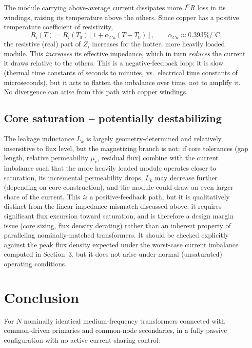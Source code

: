\documentclass[11pt,a4paper]{article}
\begin{document}
The module carrying above-average current dissipates more $I^2R$ loss in its windings, raising its temperature above the others. Since copper has a positive temperature coefficient of resistivity,
\begin{equation}
R_i(T) = R_i(T_0)\left[1+\alpha_{Cu}(T-T_0)\right], \qquad \alpha_{Cu}\approx 0.393\%/^\circ\text{C},
\end{equation}
the resistive (real) part of $Z_i$ increases for the hotter, more heavily loaded module. This \emph{increases} its effective impedance, which in turn \emph{reduces} the current it draws relative to the others. This is a negative-feedback loop: it is slow (thermal time constants of seconds to minutes, vs.\ electrical time constants of microseconds), but it acts to flatten the imbalance over time, not to amplify it. No divergence can arise from this path with copper windings.

\subsection{Core saturation -- potentially destabilizing}

The leakage inductance $L_k$ is largely geometry-determined and relatively insensitive to flux level, but the magnetizing branch is not: if core tolerances (gap length, relative permeability $\mu_r$, residual flux) combine with the current imbalance such that the more heavily loaded module operates closer to saturation, its incremental permeability drops, $L_k$ may decrease further (depending on core construction), and the module could draw an even larger share of the current. This \emph{is} a positive-feedback path, but it is qualitatively distinct from the linear-impedance mismatch discussed above: it requires significant flux excursion toward saturation, and is therefore a design margin issue (core sizing, flux density derating) rather than an inherent property of paralleling nominally-matched transformers. It should be checked explicitly against the peak flux density expected under the worst-case current imbalance computed in Section~3, but it does not arise under normal (unsaturated) operating conditions.

\section{Conclusion}

For $N$ nominally identical medium-frequency transformers connected with common-driven primaries and common-node secondaries, in a fully passive configuration with no active current-sharing control:
\end{document}

